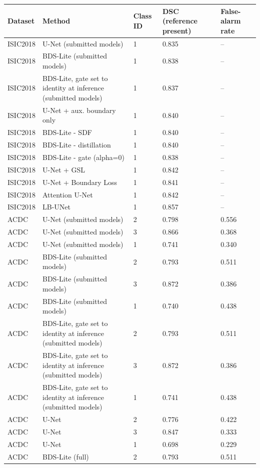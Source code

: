 \begin{tabular}{lllll}
\toprule
Dataset & Method & Class ID & DSC (reference present) & False-alarm rate \\
\midrule
ISIC2018 & U-Net (submitted models) & 1 & 0.835 & -- \\
ISIC2018 & BDS-Lite (submitted models) & 1 & 0.838 & -- \\
ISIC2018 & BDS-Lite, gate set to identity at inference (submitted models) & 1 & 0.837 & -- \\
ISIC2018 & U-Net + aux. boundary only & 1 & 0.840 & -- \\
ISIC2018 & BDS-Lite - SDF & 1 & 0.840 & -- \\
ISIC2018 & BDS-Lite - distillation & 1 & 0.840 & -- \\
ISIC2018 & BDS-Lite - gate (alpha=0) & 1 & 0.838 & -- \\
ISIC2018 & U-Net + GSL & 1 & 0.842 & -- \\
ISIC2018 & U-Net + Boundary Loss & 1 & 0.841 & -- \\
ISIC2018 & Attention U-Net & 1 & 0.842 & -- \\
ISIC2018 & LB-UNet & 1 & 0.857 & -- \\
ACDC & U-Net (submitted models) & 2 & 0.798 & 0.556 \\
ACDC & U-Net (submitted models) & 3 & 0.866 & 0.368 \\
ACDC & U-Net (submitted models) & 1 & 0.741 & 0.340 \\
ACDC & BDS-Lite (submitted models) & 2 & 0.793 & 0.511 \\
ACDC & BDS-Lite (submitted models) & 3 & 0.872 & 0.386 \\
ACDC & BDS-Lite (submitted models) & 1 & 0.740 & 0.438 \\
ACDC & BDS-Lite, gate set to identity at inference (submitted models) & 2 & 0.793 & 0.511 \\
ACDC & BDS-Lite, gate set to identity at inference (submitted models) & 3 & 0.872 & 0.386 \\
ACDC & BDS-Lite, gate set to identity at inference (submitted models) & 1 & 0.741 & 0.438 \\
ACDC & U-Net & 2 & 0.776 & 0.422 \\
ACDC & U-Net & 3 & 0.847 & 0.333 \\
ACDC & U-Net & 1 & 0.698 & 0.229 \\
ACDC & BDS-Lite (full) & 2 & 0.793 & 0.511 \\

\end{tabular}

